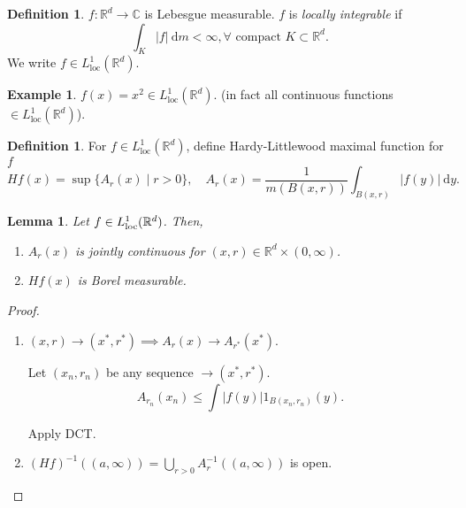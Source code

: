 \documentclass{report}
\newcommand{\R}{\mathbb{R}}
\newcommand{\C}{\mathbb{C}}
\newcommand{\df}{\ \mathrm{d}}
\newtheorem{lemma}[theorem]{Lemma}
\theoremstyle{definition}
\newtheorem{definition}[theorem]{Definition}
\newtheorem{example}[theorem]{Example}
\theoremstyle{remark}
\newcommand{\fnl}{\parbox[t]{0\linewidth}{}}
\begin{document}
\begin{definition}
	$f: \R^d \to \C$ is Lebesgue measurable. $f$ is \emph{locally integrable} if 
	\[
		\int_K |f| \df m < \infty, \forall \text{ compact }	 K \subset \R^d.
	\]
	We write $f \in L^1_{\text{loc}}(\R^d)$.
\end{definition}
\begin{example}
	$f(x) = x^2 \in L^1_{\text{loc}}(\R^d)$. (in fact all continuous functions $\in L^1_{\text{loc}}(\R^d)$).
\end{example}
\begin{definition}
	For $f \in L^1_{\text{loc}}(\R^d)$, define Hardy-Littlewood maximal function for $f$
	\[ Hf(x) = \sup \{A_r(x) \mid r > 0\}, \quad A_r(x) = \frac{1}{m(B(x, r))} \int_{B(x, r)}|f(y)| \df y.\]
\end{definition}
\begin{lemma}
	Let $f \in L^1_{\textup{loc}}(\R^d)$. Then, \begin{enumerate}
		\item $A_r(x)$ is jointly continuous for $(x, r) \in \R^d \times (0, \infty)$.
		\item $Hf(x)$ is Borel measurable.
	\end{enumerate}
\end{lemma}
\begin{proof} \fnl
	\begin{enumerate}
		\item $(x, r) \to (x^*, r^*) \implies A_r(x) \to A_{r^*}(x^*)$.

		Let $(x_n, r_n)$ be any sequence $\to (x^*, r^*)$.
		\[ A_{r_n}(x_n) \leq \int |f(y)| 1_{B(x_n, r_n)}(y).\]

		Apply DCT.

		\item $\displaystyle (Hf)^{-1}((a, \infty)) = \bigcup_{r > 0}A_r^{-1}((a, \infty))$ is open. \qedhere
	\end{enumerate}
\end{proof}
\end{document}
